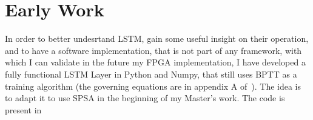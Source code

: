 \chapter{Early Work}\label{chap:earlyWork}
In order to better undesrtand LSTM,  gain some useful insight on their operation, and to have a software implementation, that is not part of any framework, with which I can validate in the future my FPGA implementation, I have developed a fully functional LSTM Layer in Python and Numpy, that still uses BPTT as a training algorithm (the governing equations are in appendix A of~\cite{Greff15}). The idea is to adapt it to use SPSA in the beginning of my Master's work. The code is present in


